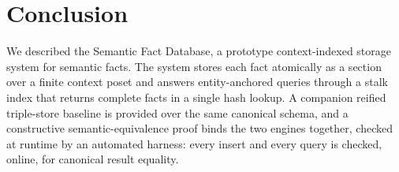 \section{Conclusion}
\label{sec:conclusion}

We described the Semantic Fact Database, a prototype context-indexed
storage system for semantic facts. The system stores each fact atomically
as a section over a finite context poset and answers entity-anchored
queries through a stalk index that returns complete facts in a single hash
lookup. A companion reified triple-store baseline is provided over the
same canonical schema, and a constructive semantic-equivalence proof
binds the two engines together, checked at runtime by an automated harness:
every insert and every query is checked,
online, for canonical result equality.

